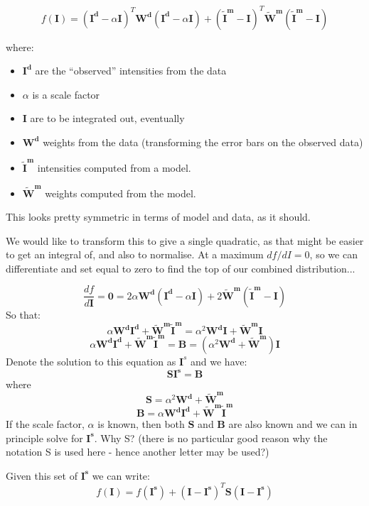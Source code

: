 \documentclass[10pt,a4paper,twoside,notitlepage]{report}
\newcommand{\mb}  [1] {\mathbf{#1}}
\begin{document}
\[ f(\mb{I}) = (\mb{I^d} - \alpha \mb{I})^T \mb{W^d} (\mb{I^d} - \alpha \mb{I})   + 
               (\mb{\tilde{I}^m} -        \mb{I})^T \mb{\tilde{W}^m} 
               (\mb{\tilde{I}^m} -        \mb{I})  \]

where:
\begin{itemize}
\item $\mb{I^d}$ are the ``observed'' intensities from the data
\item $\alpha$ is a scale factor
\item $\mb{I}$ are to be integrated out, eventually
\item $\mb{W^d}$ weights from the data (transforming the error bars on the observed data)
\item $\mb{\tilde{I}^m}$ intensities computed from a model.
\item $\mb{\tilde{W}^m}$ weights computed from the model. 
\end{itemize}
This looks pretty symmetric in terms of model and data, as it should.

We would like to transform this to give a single quadratic, as that might be easier
to get an integral of, and also to normalise.
At a maximum $df/dI = 0$, so we can differentiate and set equal to zero to find
the top of our combined distribution...

\[ \frac{df}{d\mb{I}} = \mb{0} = 2 \alpha \mb{W^d}(\mb{I^d}-\alpha\mb{I}) + 
                       2        \mb{\tilde{W}^m}(\mb{\tilde{I}^m}-      \mb{I}) \]
So that:
\[  \alpha \mb{W^d} \mb{I^d} + \mb{\tilde{W}^m}\mb{\tilde{I}^m} =   
    \alpha^2 \mb{W^d} \mb{I} +  \mb{\tilde{W}^m}  \mb{I} \]
\[  \alpha \mb{W^d} \mb{I^d} + \mb{\tilde{W}^m}\mb{\tilde{I}^m} =
    \mb{B} =  \left( \alpha^2 \mb{W^d} +  \mb{\tilde{W}^m} \right)  \mb{I} \]
Denote the solution to this equation as $\mb{I}^s$ and we have:
\[ \mb{S I^s}=\mb{B} \]
where
\[ \mb{S} = \alpha^2\mb{W^d} + \mb{\tilde{W}^m} \]
\[ \mb{B} =  \alpha \mb{W^d} \mb{I^d} + \mb{\tilde{W}^m}\mb{\tilde{I}^m} \]
If the scale factor, $\alpha$ is known, then both $\mb{S}$ and $\mb{B}$ are also known
and we can in principle solve for $\mb{I^s}$. Why S? (there is no
particular good reason why the notation S is used here - hence another
letter may be used?)

Given this set of $\mb{I^s}$ we can write:
\[ f(\mb{I}) = f(\mb{I^s}) + (\mb{I} - \mb{I^s})^T \mb{S} (\mb{I} - \mb{I^s}) \]
\end{document}
